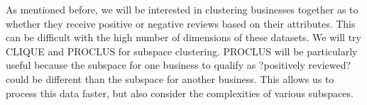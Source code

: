 \quad As mentioned before, we will be interested in clustering businesses together as to whether they receive positive or negative reviews based on their attributes. This can be difficult with the high number of dimensions of these datasets. We will try CLIQUE and PROCLUS for subspace clustering. PROCLUS will be particularly useful because the subspace for one business to qualify as ?positively reviewed? could be different than the subspace for another business. This allows us to process this data faster, but also consider the complexities of various subspaces. 



%



